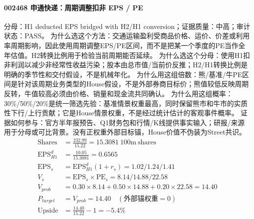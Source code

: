\paragraph{002468 申通快递：周期调整扣非 EPS / PE}
分母：H1 deducted EPS bridged with H2/H1 conversion；证据质量：中高；审计状态：PASS。
为什么选这个方法：交通运输盈利受商品价格、运价、价差或利用率周期影响，因此使用周期调整EPS/PE区间，而不是把某一个季度的PE当作全年估值。H2转换比例用于检验当前周期能否延续。
为什么选这个分母：使用H1扣非利润以减少非经常性收益污染；股本由总市值/当前价反推；H2/H1转换比例是明确的季节性和交付假设，不是机械年化。
为什么用这组倍数：熊/基准/牛PE区间是针对该周期业务类型的House假设，不是外部券商目标价；熊值较低反映周期反转，牛值较高必须由价格、销量和现金流共同确认。
为什么用这组概率：30\%/50\%/20\%是统一筛选先验：基准情景权重最高，同时保留熊市和牛市的实质性下行/上行贡献；它是House情景权重，不是经过统计估计的客观事件概率。
证据如何参与：官方半年报预告、Q1财务包和行情/K线提供事实输入；研报/来源用于分母或可比背景。没有正权重外部目标锚，House价值不伪装为Street共识。
\begin{align*}
\mathrm{Shares} &= \frac{232.99}{15.22}=15.3081\ \mathrm{100m\ shares}\\
\mathrm{EPS}_{H1}^d &= \frac{10.05}{15.3081}=0.6565\\
\mathrm{EPS}_s &= \mathrm{EPS}_{H1}^d(1+r_s)=1.02/1.24/1.41\\
V_s &= \mathrm{EPS}_s\times \mathrm{PE}_s=8.14/14.88/22.58\\
V_{prob} &= 0.30\times 8.14+0.50\times 14.88+0.20\times 22.58=14.40\\
P_{target} &= V_{prob}=14.40\quad(\text{外部锚权重}=0)\\
\mathrm{Upside} &= \frac{14.40}{15.22}-1=-5.4\%\\
\end{align*}

